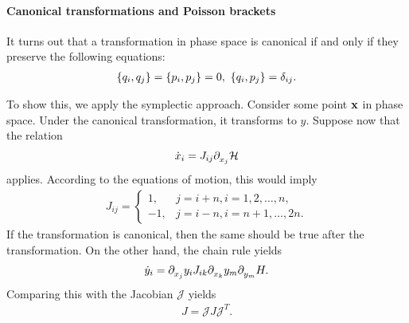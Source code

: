 \paragraph{Canonical transformations and Poisson brackets}
It turns out that a transformation in phase space is canonical if and only if they preserve the following equations:
\begin{align*}
	\left\{q_{i}, q_{j}\right\} = \left\{p_{i}, p_{j}\right\} = 0,\ \left\{q_{i}, p_{j}\right\} = \delta_{ij}.
\end{align*}

To show this, we apply the symplectic approach. Consider some point $\vb{x}$ in phase space. Under the canonical transformation, it transforms to $y$. Suppose now that the relation
\begin{align*}
	\dot{x}_{i} = J_{ij}\partial^{}_{x_{j}}\mathcal{H}
\end{align*}
applies. According to the equations of motion, this would imply
\begin{align*}
	J_{ij} = 
	\begin{cases}
		 1, &j = i + n, i = 1, 2, \dots, n, \\
		-1, &j = i - n, i = n + 1, \dots, 2n.
	\end{cases}
\end{align*}
If the transformation is canonical, then the same should be true after the transformation. On the other hand, the chain rule yields
\begin{align*}
	\dot{y}_{i} = \partial^{}_{x_{j}}y_{i}J_{ik}\partial^{}_{x_{k}}y_{m}\partial^{}_{y_{m}}H.
\end{align*}
Comparing this with the Jacobian $\mathcal{J}$ yields
\begin{align*}
	J = \mathcal{J}J\mathcal{J}^{T}.
\end{align*}

